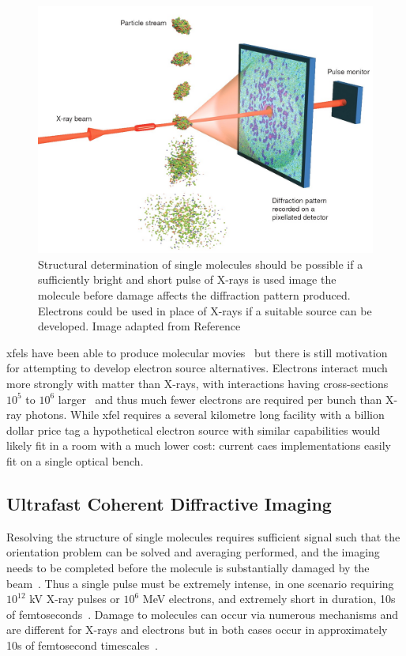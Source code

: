\begin{figure}
    \center
    \includegraphics[width=0.65\linewidth]{0intro/Figs/single_molecule_cdi.jpg}
    \caption[Structural determination of single molecules.]{Structural determination of single molecules should be possible if a sufficiently bright and short pulse of X-rays is used image the molecule before damage affects the diffraction pattern produced. Electrons could be used in place of X-rays if a suitable source can be developed. Image adapted from Reference~\cite{gaffney_imaging_2007}}
    \label{figure:molecule_cdi}
\end{figure}

\Glspl{xfel} have been able to produce molecular movies~\cite{kupitz_structural_2016,pande_femtosecond_2016,nango_three-dimensional_2016} but there is still motivation for attempting to develop electron source alternatives.
Electrons interact much more strongly with matter than X-rays, with interactions having cross-sections $10^5$ to $10^6$ larger~\cite{sciaini_femtosecond_2011} and thus much fewer electrons are required per bunch than X-ray photons.
While \gls{xfel} requires a several kilometre long facility with a billion dollar price tag a hypothetical electron source with similar capabilities would likely fit in a room with a much lower cost: current \gls{caes} implementations easily fit on a single optical bench.

\subsection{Ultrafast Coherent Diffractive Imaging}

Resolving the structure of single molecules requires sufficient signal such that the orientation problem can be solved and averaging performed, and the imaging needs to be completed before the molecule is substantially damaged by the beam~\cite{huldt_diffraction_2003}.
Thus a single pulse must be extremely intense, in one scenario requiring $10^{12}$ \unit[8]{kV} X-ray pulses or $10^6$ \unit[3]{MeV} electrons, and extremely short in duration, 10s of femtoseconds~\cite{chapman_femtosecond_2006,spence_outrunning_2017}.
Damage to molecules can occur via numerous mechanisms and are different for X-rays and electrons but in both cases occur in approximately 10s of femtosecond timescales~\cite{spence_outrunning_2017}.


